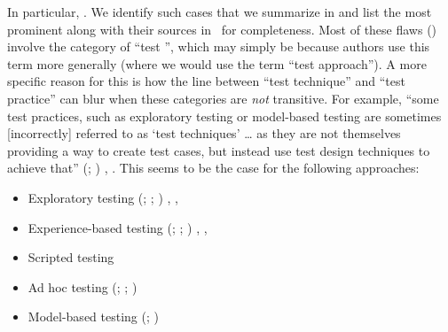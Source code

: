 \label{multiCats}
\ifnotpaper
    \begin{table}
        \vspace{-0.9cm}
        
        \vspace{-1cm}
    \end{table}
\fi
In particular, \multiCatIntro{}. We identify \multiCatCount{} such cases
\ifnotpaper that we summarize in  \fi and list
\ifnotpaper \else the most prominent \fi along with their sources in
\ifnotpaper\ for completeness\fi.
Most of these flaws (\multiCatMaxCount{}) involve the category of ``test
\multiCatMax{}'', which may simply be because authors use
this term more generally (where we would use the term
``test approach'').\label{cats-intrans} A more
specific reason for this is how the line between ``test technique'' and
``test practice'' can blur when these categories are \emph{not}
transitive. For example, ``some test practices, such as exploratory testing or
model-based testing are sometimes [incorrectly] referred to as `test techniques'
\dots{} as they are not themselves providing a way to create test cases, but
instead use test design techniques to achieve that'' \ifnotpaper
    (\citealp[p.~11]{IEEE2022}; \citeyear[p.~5]{IEEE2021a})\else
    \cite[p.~11]{IEEE2022}, \cite[p.~5]{IEEE2021a}\fi. This seems to be the
case for the following approaches:
\begin{itemize}
    \item Exploratory testing \ifnotpaper (\citeyear[p.~33]{IEEE2022};
              \citeyear[p.~viii]{IEEE2021c}; \citeyear[p.~13]{IEEE2013}) \else
              \cite[p.~33]{IEEE2022}, \cite[p.~viii]{IEEE2021c},
              \cite[p.~13]{IEEE2013} \fi
    \item Experience-based testing \ifnotpaper (\citeyear[p.~4]{IEEE2022};
              \citeyear[pp.~viii, 4]{IEEE2021c}; \citeyear[p.~33]{IEEE2013})
          \else \cite[p.~4]{IEEE2022}, \cite[pp.~viii, 4]{IEEE2021c},
              \cite[p.~33]{IEEE2013} \fi
    \item Scripted testing \citeyearpar[p.~33]{IEEE2022} \ifnotpaper
    \item Ad hoc testing (\citealp[p.~5\=/14]{SWEBOK2024}; \citealpISTQB{};
          \citealp[p.~42]{Kam2008})
    \item Model-based testing (\citealp[pp.~1\==2]{EngströmAndPetersen2015};
          \citealp[p.~4]{Kam2008}) \fi
\end{itemize}

